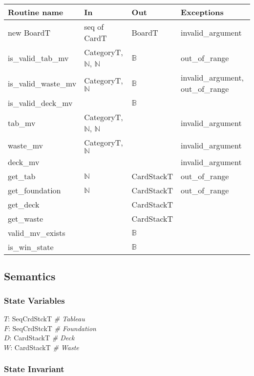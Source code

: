 \documentclass[12pt]{article}
\begin{document}
\begin{tabular}{| l | l | l | l |}
\hline
\textbf{Routine name} & \textbf{In} & \textbf{Out} & \textbf{Exceptions}\\
\hline
new BoardT  & seq of CardT & BoardT & invalid\_argument\\
\hline
is\_valid\_tab\_mv & CategoryT, $\mathbb{N}$, $\mathbb{N}$ & $\mathbb{B}$ & out\_of\_range\\
\hline
is\_valid\_waste\_mv & CategoryT, $\mathbb{N}$ & $\mathbb{B}$ &
                                                                invalid\_argument, out\_of\_range\\
\hline
is\_valid\_deck\_mv &  &  $\mathbb{B}$ & \\
\hline
tab\_mv & CategoryT, $\mathbb{N}$, $\mathbb{N}$ & & invalid\_argument\\
\hline
waste\_mv & CategoryT, $\mathbb{N}$ & & invalid\_argument\\
\hline
deck\_mv &  & & invalid\_argument\\
\hline
get\_tab & $\mathbb{N}$ & CardStackT & out\_of\_range\\
\hline
get\_foundation & $\mathbb{N}$ & CardStackT & out\_of\_range\\
\hline
get\_deck &  & CardStackT & \\
\hline
get\_waste &  & CardStackT & \\
\hline
valid\_mv\_exists & & $\mathbb{B}$ &\\
\hline
is\_win\_state & & $\mathbb{B}$ & \\
\hline
\end{tabular}

\subsection* {Semantics}

\subsubsection* {State Variables}

$T$: SeqCrdStckT \textit{\# Tableau}\\
$F$: SeqCrdStckT \textit{\# Foundation}\\
$D$: CardStackT \textit{\# Deck}\\
$W$: CardStackT \textit{\# Waste}\\

\subsubsection* {State Invariant}
\end{document}
